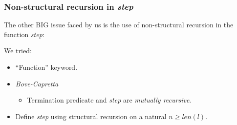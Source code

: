 \documentclass{beamer}
\begin{document}
        \begin{frame}
            \frametitle{Non-structural recursion in \emph{step}}
            The other BIG issue faced by us is the use of non-structural recursion
            in the function \emph{step}:

            \vspace{0.5cm}

            \haskellStep

            We tried:
            \begin{itemize}
                \item ``Function'' keyword.
                \item \emph{Bove-Capretta}
                    \begin{itemize}
                        \item Termination predicate and \emph{step} are
                            \emph{mutually recursive}.
                    \end{itemize}
                \item Define \emph{step} using structural recursion on a natural
                    $n \geq len(l)$.
            \end{itemize}
        \end{frame}
\end{document}
